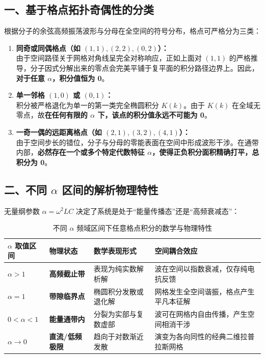 \documentclass[12pt,a4paper]{ctexart}
\begin{document}
\subsection{一、基于格点拓扑奇偶性的分类}
根据分子的余弦高频振荡波形与分母在全空间的符号分布，格点可严格分为三类：
\begin{enumerate}
    \item \textbf{同奇或同偶格点（如 $(1,1), (2,2), (0,2)$）：} \\
    由于空间路径关于网格对角线呈完全对称响应，正如上面对 $(1,1)$ 的严格推导，分子因式分解出来的零点会完美平铺于复平面的积分路径边界上。因此，\textbf{对于任意 $\alpha$，积分值恒为 0}。
    
    \item \textbf{单一邻格 $(1,0)$ 或 $(0,1)$：} \\
    积分被严格退化为单一的第一类完全椭圆积分 $K(k)$。由于 $K(k)$ 在全域无零点，故\textbf{在任何有限的 $\alpha$ 下，该点的积分值永远不可能为 0}。
    
    \item \textbf{一奇一偶的远距离格点（如 $(2,1), (3,2), (4,1)$）：} \\
    由于空间步长的错位，分子与分母的零能表面在空间中形成波形干涉。在通带内部，\textbf{必然存在一个或多个特定代数特征 $\alpha$，使得正负积分面积精确打平，总积分为 0}。
\end{enumerate}

\subsection{二、不同 $\alpha$ 区间的解析物理特性}
无量纲参数 $\alpha = \omega^2 LC$ 决定了系统是处于“能量传播态”还是“高频衰减态”：

\begin{table}[htbp]
\centering
\caption{不同 $\alpha$ 频域区间下任意格点积分的数学与物理特性}
\begin{tabular}{llll}
\toprule
$\alpha$ 取值区间 & 物理状态 & 数学表现形式 & 空间耦合效应 \\
\midrule
$\alpha > 1$ & \textbf{高频截止带} & 表现为纯实数解析解 & 波在空间以指数衰减，仅存纯电抗反馈 \\
$\alpha = 1$ & \textbf{带隙临界点} & 椭圆积分发散或退化解 & 网格发生全空间谐振，格点产生平凡本征解 \\
$0 < \alpha < 1$ & \textbf{能量通带内} & 分裂为实部与复数虚部 & 波可在网格内自由传播，产生空间相消干涉 \\
$\alpha \to 0$ & \textbf{直流/低频极限} & 趋向于对数渐近发散 & 演变为各向同性的经典二维拉普拉斯网格 \\
\bottomrule
\end{tabular}
\end{table}
\end{document}
